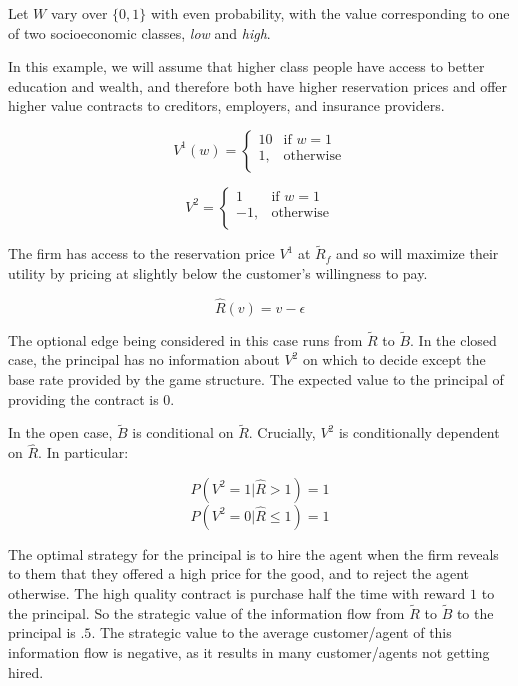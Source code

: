 \documentclass[../thesis.tex]{subfiles}
\begin{document}
\begin{exm}
  Let $W$ vary over $\{0,1\}$ with even probability,
  with the value corresponding to one of two socioeconomic
  classes, \emph{low} and \emph{high}.

  In this example, we will assume that higher class people
  have access to better education and wealth, and therefore
  both have higher reservation prices and offer higher value
  contracts to creditors, employers, and insurance providers.

  $$V^1(w) = \begin{cases}
    10 & \text{if } w  = 1 \\
    1, & \text{otherwise}\\
  \end{cases}$$
  
  $$V^2 = \begin{cases}
    1 & \text{if } w  = 1 \\
    -1, & \text{otherwise}\\
  \end{cases}$$

  The firm has access to the reservation price $V^1$
  at $\tilde{R}_f$ and so will maximize their utility
  by pricing at slightly below the customer's willingness
  to pay.

  $$\hat{R}(v) = v - \epsilon$$

  The optional edge being considered in this case runs
  from $\tilde{R}$ to $\tilde{B}$.
  In the closed case, the principal has no information
  about $V^2$ on which to decide except the base rate
  provided by the game structure.
  The expected value to the principal of providing the contract
  is $0$.

  In the open case, $\tilde{B}$ is conditional on $\tilde{R}$.
  Crucially, $V^2$ is conditionally dependent on $\hat{R}$.
  In particular:

  $$P(V^2 = 1 \vert \hat{R} > 1) = 1$$
  $$P(V^2 = 0 \vert \hat{R} \leq 1) = 1$$

  The optimal strategy for the principal is to hire
  the agent when the firm reveals to them that they offered
  a high price for the good, and to reject the agent otherwise.
  The high quality contract is purchase half the time with reward
  $1$ to the principal.
  So the strategic value of the information flow from $\tilde{R}$
  to $\tilde{B}$ to the principal is $.5$.
  The strategic value to the average customer/agent of this information flow
  is negative, as it results in many customer/agents not getting hired.
\end{exm}
\end{document}
